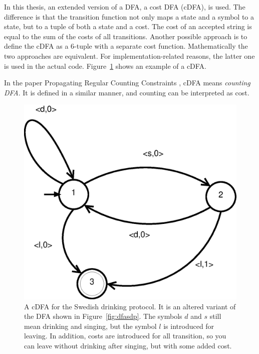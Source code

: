 \documentclass[a4paper,11pt]{article}
\begin{document}
In this thesis, an extended version of a DFA, a cost DFA (cDFA), is used. The difference is that the transition function not only maps a state and a symbol to a state, but to a tuple of both a state and a cost. The cost of an accepted string is equal to the sum of the costs of all transitions. Another possible approach is to define the cDFA as a 6-tuple with a separate cost function. Mathematically the two approaches are equivalent. For implementation-related reasons, the latter one is used in the actual code. Figure~\ref{fig:cdfasdp} shows an example of a cDFA.

In the paper Propagating Regular Counting Constraints \cite{Beldiceanu675954}, cDFA means \textit{counting DFA}. It is defined in a similar manner, and counting can be interpreted as cost. 

\begin{figure}[H]
\centering
\includegraphics[scale=0.6]{cdfa.eps}
\caption{A cDFA for the Swedish drinking protocol. It is an altered variant of the DFA shown in Figure~\ref{fig:dfasdp}. The symbols $d$ and $s$ still mean drinking and singing, but the symbol $l$ is introduced for leaving. In addition, costs are introduced for all transition, so you can leave without drinking after singing, but with some added cost.}
\label{fig:cdfasdp}
\end{figure}
\end{document}
